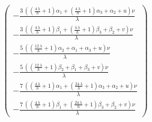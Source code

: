 \documentclass{article}
\begin{document}
\begin{gather}
\begin{pmatrix}
          -\frac{3 \, {({(\frac{4 \, \lambda}{h} + 1)} \alpha_{1} + {(\frac{4 \, \lambda}{h} + 1)} \alpha_{3} + \alpha_{2} + u)} \nu}{\lambda} \\
          -\frac{3 \, {({(\frac{4 \, \lambda}{h} + 1)} \beta_{1} + {(\frac{4 \, \lambda}{h} + 1)} \beta_{3} + \beta_{2} + v)} \nu}{\lambda} \\
          -\frac{5 \, {({(\frac{12 \, \lambda}{h} + 1)} \alpha_{2} + \alpha_{1} + \alpha_{3} + u)} \nu}{\lambda} \\
          -\frac{5 \, {({(\frac{12 \, \lambda}{h} + 1)} \beta_{2} + \beta_{1} + \beta_{3} + v)} \nu}{\lambda} \\
          -\frac{7 \, {({(\frac{4 \, \lambda}{h} + 1)} \alpha_{1} + {(\frac{24 \, \lambda}{h} + 1)} \alpha_{3} + \alpha_{2} + u)} \nu}{\lambda} \\
          -\frac{7 \, {({(\frac{4 \, \lambda}{h} + 1)} \beta_{1} + {(\frac{24 \, \lambda}{h} + 1)} \beta_{3} + \beta_{2} + v)} \nu}{\lambda}
          \end{pmatrix}
      \end{gather}
\end{document}
